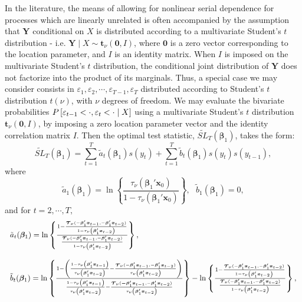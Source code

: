 \documentclass[harvard,11pt]{article}
\begin{document}
 In the literature, the means of allowing for nonlinear serial dependence for processes which are linearly unrelated is often accompanied by the assumption that $\bm{Y}$ conditional on $X$ is distributed according to a multivariate Student's $t$ distribution - i.e. $\bm{Y}\mid X\sim \bm{t}_{\nu}(\bm{0},I)$, where $\bm{0}$ is a zero vector corresponding to the location parameter, and  $I$ is an identity matrix. When $I$ is imposed on the multivariate Student's $t$ distribution, the conditional joint distribution of $\bm{Y}$ does not factorize into the product of its marginals. Thus, a special case we may consider consists in $\varepsilon_1,\varepsilon_2,\cdots,\varepsilon_{T-1},\varepsilon_T$ distributed according to Student's $t$ distribution $t(\nu)$, with $\nu$ degrees of freedom.  We may evaluate the bivariate probabilities $P\left[\varepsilon_{t-1}<\cdot ,\-
\varepsilon_{t}<\cdot \mid X\right]$ using a multivariate Student's $t$ distribution $\bm{t}_\nu(\bm{0},I)$, by imposing a zero location parameter vector and the identity correlation matrix $I$.
 Then the optimal test statistic, $\widetilde{SL}_{T}(\bm{\beta}_{1})$, takes the form:
\begin{equation*}
\widetilde{SL}_{T}(\bm{\beta}_{1})=\sum\limits_{t=1}^{T}\tilde{a}_{t}(\bm{\beta}_{1})%
s(y_{t})+\sum\limits_{t=1}^{T}\tilde{b}_{t}(\bm{\beta}_{1})%
s(y_{t})s(y_{t-1}),
\end{equation*}%
where%
\begin{equation*}
\tilde{a}_{1}(\bm{\beta}_{1})=\ln \left\{ \frac{\tau_{\nu}(\bm{\beta}_1'\bm{x}_0) }{1-\tau_{\nu}(\bm{\beta}_1'\bm{x}_0)}\right\} ,\text{ }\tilde{b}_{1}(\bm{\beta}_{1})=0,
\end{equation*}%
and for $t=2,\cdots,T,$%
\begin{equation*}
\begin{tabular}{l}
$\tilde{a}_{t}(\bm{\beta} _{1})=\ln \left\{ \frac{1-\frac{\bm{\mathcal{T}}_{\nu}(-\bm{\beta}_1'\bm{x}_{t-1},-\bm{\beta}_1'\bm{x}_{t-2}) }{1-\tau_{\nu}\left(\bm{\beta}_1'\bm{x}_{t-2}\right)}}{\frac{\bm{\mathcal{T}}_{\nu}(-\bm{\beta}_1'\bm{x}_{t-1},-\bm{\beta}_1'\bm{x}_{t-2}) }{1-\tau_{\nu}\left(\bm{\beta}_1'\bm{x}_{t-2}\right)}}\right\}, $ \\ 
\\ 
$\tilde{b}_{t}(\bm{\beta}_{1})=\ln \left\{ \frac{1-\left( \frac{1-\tau_{\nu}\left(\bm{\beta}_1'\bm{x}_{t-1}\right) }{\tau_{\nu}\left(\bm{\beta}_1'\bm{x}_{t-2}\right) }-\frac{\bm{\mathcal{T}}_{\nu}(-\bm{\beta}_1'\bm{x}_{t-1},-\bm{\beta}_1'\bm{x}_{t-2}) }{\tau_{\nu}\left(\bm{\beta}_1'\bm{x}_{t-2}\right) }\right) }{\frac{1-\tau_{\nu}\left(\bm{\beta}_1'\bm{x}_{t-1}\right)}{\tau_{\nu}\left(\bm{\beta}_1'\bm{x}_{t-2}\right) }-\frac{\bm{\mathcal{T}}_{\nu}(\bm{-\beta}_1'\bm{x}_{t-1},-\bm{\beta}_1'\bm{x}_{t-2}) }{\tau_{\nu}\left(\bm{\beta}_1'\bm{x}_{t-2}\right)}}\right\} -\ln \left\{ \frac{1-\frac{\bm{\mathcal{T}}_{\nu}(-\bm{\beta}_1'\bm{x}_{t-1},-\bm{\beta}_1'\bm{x}_{t-2}) }{1-\tau_{\nu}\left(\bm{\beta}_1'\bm{x}_{t-2}\right) }}{\frac{\bm{\mathcal{T}}_{\nu}(-\bm{\beta}_1'\bm{x}_{t-1},-\bm{\beta}_1'\bm{x}_{t-2})}{1-\tau_{\nu}\left(\bm{\beta}_1'\bm{x}_{t-2}\right)}}\right\}, $%
\end{tabular}%
\end{equation*}%
\end{document}
